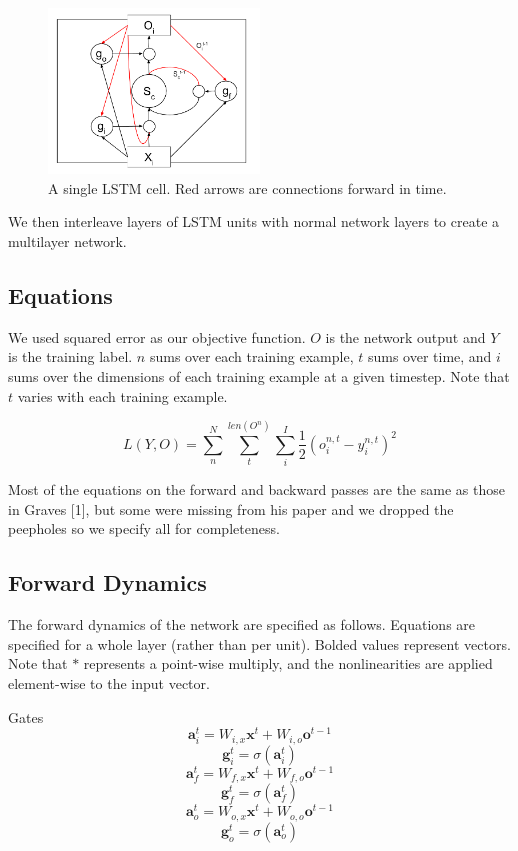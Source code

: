 \documentclass[11pt]{article}
\begin{document}
\begin{figure}[ht]
\caption{A single LSTM cell. Red arrows are connections forward in time.}
  \centering
    \includegraphics[width=0.5\textwidth]{lstm_cell}
\end{figure}

We then interleave layers of LSTM units with
normal network layers to create a multilayer network.

\subsection{Equations}

We used squared error as our objective function. \(O\) is the network
output and \(Y\) is the training label. \(n\) sums over each
training example, \(t\) sums over time, and \(i\) sums over the dimensions
of each training example at a given timestep.
Note that \(t\) varies with each training example.

\[  L(Y, O) = \sum_{n}^{N}  \sum_{t}^{len(O^{n})} \sum_{i}^{I} \frac{1}{2} (o_{i}^{n,t} - y_{i}^{n,t})^{2} \]

Most of the equations on the forward and backward passes are the
same as those in Graves [1], but some were missing from his paper
and we dropped the peepholes so we specify all for completeness.

\subsection{Forward Dynamics}
The forward dynamics of the network are specified as follows. Equations
are specified for a whole layer (rather than per unit).
 Bolded values represent vectors. Note that \(*\)
represents a point-wise multiply, and the nonlinearities are applied
element-wise to the input vector.

Gates
\[ \textbf{a}_{i}^{t} = W_{i,x}\textbf{x}^{t} +  W_{i,o}\textbf{o}^{t-1} \] 
\[ \textbf{g}_{i}^{t} = \sigma( \textbf{a}_{i}^{t}) \]
\[ \textbf{a}_{f}^{t} = W_{f,x}\textbf{x}^{t} +  W_{f,o}\textbf{o}^{t-1} \] 
\[ \textbf{g}_{f}^{t} = \sigma( \textbf{a}_{f}^{t}) \]
\[ \textbf{a}_{o}^{t} = W_{o,x}\textbf{x}^{t} +  W_{o,o}\textbf{o}^{t-1} \] 
\[ \textbf{g}_{o}^{t} = \sigma( \textbf{a}_{o}^{t}) \]
\end{document}

